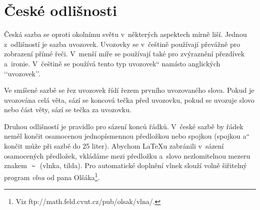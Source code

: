 \documentclass[a4paper, twocolumn, 11pt]{article}
\newcommand{\myuv}[1]{\quotedblbase #1\textquotedblleft}
\begin{document}
\section{České odlišnosti}
Česká sazba se oproti okolnímu světu v~některých aspektech mírně liší. Jednou z~odlišností je sazba uvozovek. Uvozovky se v~češtině používají převážně pro zobrazení přímé řeči. V~menší míře se používají také pro zvýraznění přezdívek a~ironie. V~češtině se po\-u\-ží\-vá tento \myuv{typ uvozovek} namísto anglických ‘‘u\-vo\-zo\-vek’’.


Ve smíšené sazbě se řez uvozovek řídí řezem pr\-vní\-ho uvozovaného slova. Pokud je uvozována celá věta, sází se koncová tečka před uvozovku, pokud se uvozuje slovo nebo část věty, sází se tečka za uvozovku.


Druhou odlišností je pravidlo pro sázení konců řádků. V~české sazbě by řádek neměl končit osamocenou jednopísmennou předložkou nebo spojkou (spojkou \myuv{a} končit může při sazbě do 25 liter). Abychom \LaTeX u zabránili v~sázení osamocených předložek, vkládáme mezi předložku a~slovo nezlomitelnou mezeru znakem\ \,\verb|~|\ \,(vlnka, tilda). Pro automatické do\-pl\-ně\-ní vlnek slouží volně šiřitelný program \emph{vlna} od pana Olšáka\footnote{Viz ftp://math.feld.cvut.cz/pub/olsak/vlna/.}.
\end{document}
